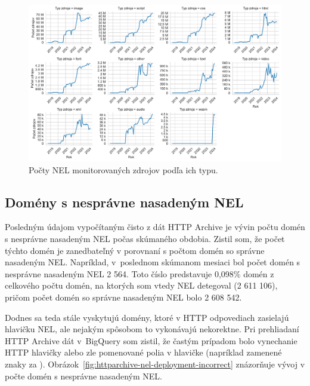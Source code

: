 \begin{figure}[!htb]
\begin{center}
 \includegraphics[scale=0.56]{obrazky-figures/httparchive_nel_resource_types_dist.pdf}
 \caption{Počty NEL monitorovaných zdrojov podľa ich typu.}
 \label{fig:httparchive-nel-resource-types-dist}
\end{center}
\end{figure}

\pagebreak



\subsection{Domény s nesprávne nasadeným NEL}

Posledným údajom vypočítaným čisto z dát HTTP Archive je vývin počtu domén s nesprávne nasadeným NEL počas skúmaného obdobia.
Zistil som, že počet týchto domén je zanedbateľný v porovnaní s počtom domén so správne nasadeným NEL.
Napríklad, \mbox{v poslednom} skúmanom mesiaci bol počet domén s nesprávne nasadeným NEL 2 564. 
Toto číslo predstavuje 0,098\% domén z celkového počtu domén, na ktorých som vtedy NEL detegoval (2 611 106), pričom počet domén so správne nasadeným NEL bolo 2 608 542.

Dodnes sa teda stále vyskytujú domény, ktoré v HTTP odpovediach zasielajú hlavičku NEL, ale nejakým spôsobom to vykonávajú nekorektne.
Pri prehliadaní HTTP Archive dát \mbox{v BigQuery} som zistil, že častým prípadom bolo vynechanie HTTP hlavičky  alebo zle pomenované polia v hlavičke  (napríklad zamenené znaky  za ). 
\mbox{Obrázok \ref{fig:httparchive-nel-deployment-incorrect}} znázorňuje vývoj v počte domén s nesprávne nasadeným NEL.

